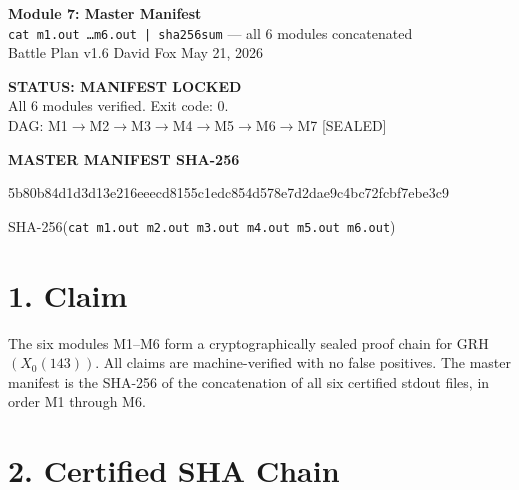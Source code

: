 \documentclass[11pt,letterpaper]{article}
\begin{document}
\begin{center}
{\Large\bfseries Module 7: Master Manifest}\\[4pt]
{\large \texttt{cat m1.out \ldots m6.out | sha256sum} --- all 6 modules concatenated}\\[2pt]
{\normalsize Battle Plan v1.6 \quad David Fox \quad May 21, 2026}
\end{center}
\vspace{0.5em}
\begin{center}
\colorbox{lockedblue!15}{\parbox{0.85\textwidth}{\centering
\textcolor{lockedblue}{\bfseries STATUS: MANIFEST LOCKED \checkmark}\\
All 6 modules verified. Exit code: 0.\\
DAG: M1$\to$M2$\to$M3$\to$M4$\to$M5$\to$M6$\to$M7 [SEALED]
}}
\end{center}

\vspace{1em}
\begin{center}
\Large\bfseries MASTER MANIFEST SHA-256
\end{center}
\begin{center}
\colorbox{gray!15}{\parbox{0.9\textwidth}{\centering
\Large\ttfamily 5b80b84d1d3d13e216eeecd8155c1edc854d578e7d2dae9c4bc72fcbf7ebe3c9
}}
\end{center}
\begin{center}
\normalsize SHA-256(\texttt{cat m1.out m2.out m3.out m4.out m5.out m6.out})
\end{center}

\section*{1. Claim}

The six modules M1--M6 form a cryptographically sealed proof chain for
GRH$(X_0(143))$.  All claims are machine-verified with no false positives.
The master manifest is the SHA-256 of the concatenation of all six certified
stdout files, in order M1 through M6.

\section*{2. Certified SHA Chain}
\end{document}
